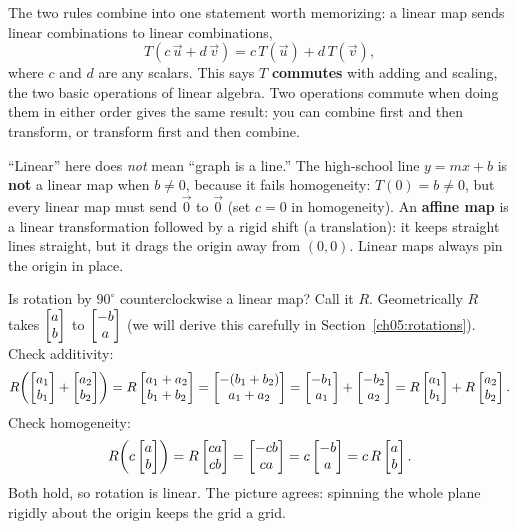 The two rules combine into one statement worth memorizing: a linear map
sends linear combinations to linear combinations,
\[
  T(c\,\vec{u} + d\,\vec{v}) = c\,T(\vec{u}) + d\,T(\vec{v}),
\]
where $c$ and $d$ are any scalars. This says $T$ \textbf{commutes} with adding and
scaling, the two basic operations of linear algebra. Two operations commute when
doing them in either order gives the same result: you can combine first and then
transform, or transform first and then combine.

\begin{trapbox}
``Linear'' here does \emph{not} mean ``graph is a line.'' The high-school line
$y = mx + b$ is \textbf{not} a linear map when $b \neq 0$, because it fails
homogeneity: $T(0) = b \neq 0$, but every linear map must send $\vec{0}$ to
$\vec{0}$ (set $c = 0$ in homogeneity). An \textbf{affine map} is a linear
transformation followed by a rigid shift (a translation): it keeps straight lines
straight, but it drags the origin away from $(0,0)$. Linear maps always pin the
origin in place.
\end{trapbox}

\begin{example}
\label{ch05:check-linear}
Is rotation by $90^\circ$ counterclockwise a linear map? Call it $R$. Geometrically
$R$ takes $\begin{bmatrix}a\\b\end{bmatrix}$ to $\begin{bmatrix}-b\\a\end{bmatrix}$ (we will derive this carefully in
Section~\ref{ch05:rotations}). Check additivity:
\[
  R\!\left(\begin{bmatrix}a_1\\b_1\end{bmatrix} + \begin{bmatrix}a_2\\b_2\end{bmatrix}\right)
  = R\begin{bmatrix}a_1+a_2\\b_1+b_2\end{bmatrix}
  = \begin{bmatrix}-(b_1+b_2)\\a_1+a_2\end{bmatrix}
  = \begin{bmatrix}-b_1\\a_1\end{bmatrix} + \begin{bmatrix}-b_2\\a_2\end{bmatrix}
  = R\begin{bmatrix}a_1\\b_1\end{bmatrix} + R\begin{bmatrix}a_2\\b_2\end{bmatrix}.
\]
Check homogeneity:
\[
  R\!\left(c\begin{bmatrix}a\\b\end{bmatrix}\right) = R\begin{bmatrix}ca\\cb\end{bmatrix} = \begin{bmatrix}-cb\\ca\end{bmatrix}
  = c\begin{bmatrix}-b\\a\end{bmatrix} = c\,R\begin{bmatrix}a\\b\end{bmatrix}.
\]
Both hold, so rotation is linear. The picture agrees: spinning the
whole plane rigidly about the origin keeps the grid a grid.
\end{example}

